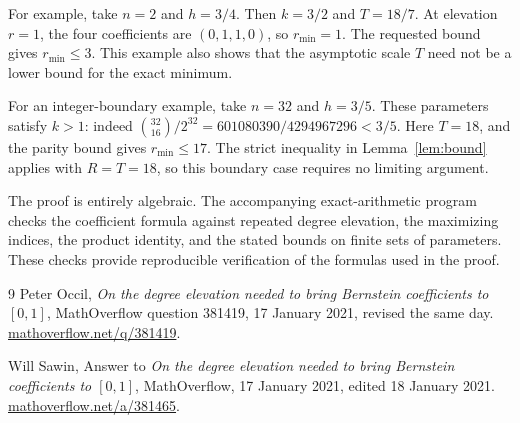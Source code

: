 \documentclass[11pt]{article}
\begin{document}
For example, take $n=2$ and $h=3/4$. Then $k=3/2$ and $T=18/7$.
At elevation $r=1$, the four coefficients are $(0,1,1,0)$, so
$r_{\min}=1$. The requested bound gives $r_{\min}\le3$.
This example also shows that the asymptotic scale $T$ need not be
a lower bound for the exact minimum.

For an integer-boundary example, take $n=32$ and $h=3/5$. These
parameters satisfy $k>1$: indeed
$\binom{32}{16}/2^{32}=601080390/4294967296<3/5$.
Here $T=18$, and the parity bound gives $r_{\min}\le17$.
The strict inequality in Lemma~\ref{lem:bound} applies with $R=T=18$,
so this boundary case requires no limiting argument.

The proof is entirely algebraic. The accompanying exact-arithmetic
program checks the coefficient formula against repeated degree
elevation, the maximizing indices, the product identity, and the
stated bounds on finite sets of parameters. These checks provide
reproducible verification of the formulas used in the proof.

\begin{thebibliography}{9}
Peter Occil,
\emph{On the degree elevation needed to bring Bernstein coefficients
to $[0,1]$}, MathOverflow question 381419,
17 January 2021, revised the same day.
\href{https://mathoverflow.net/q/381419}{mathoverflow.net/q/381419}.

Will Sawin,
Answer to \emph{On the degree elevation needed to bring Bernstein
coefficients to $[0,1]$}, MathOverflow,
17 January 2021, edited 18 January 2021.
\href{https://mathoverflow.net/a/381465}{mathoverflow.net/a/381465}.
\end{thebibliography}
\end{document}
